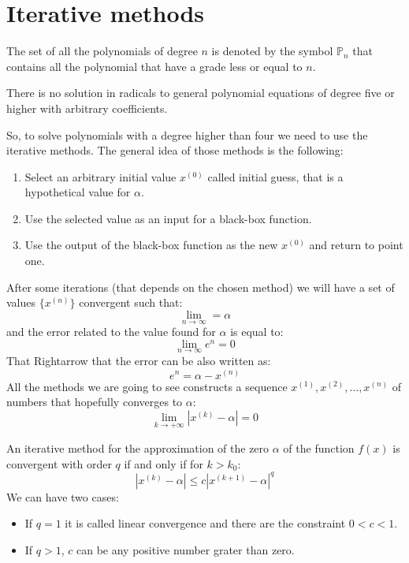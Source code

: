 \documentclass[12pt, a4paper]{report}
\begin{document}
    \section{Iterative methods}
    The set of all the polynomials of degree $n$ is denoted by the symbol $\mathbb{P}_n$ that contains all the polynomial that have a grade less or equal to $n$.
    \begin{theorem}
        There is no solution in radicals to general polynomial equations of degree five or higher with arbitrary coefficients. 
    \end{theorem}
    So, to solve polynomials with a degree higher than four we need to use the iterative methods. The general idea of those methods is the following:
    \begin{enumerate}
        \item Select an arbitrary initial value $x^{(0)}$ called initial guess, that is a hypothetical value for $\alpha$.
        \item Use the selected value as an input for a black-box function.
        \item Use the output of the black-box function as the new $x^{(0)}$ and return to point one. 
    \end{enumerate}
    After some iterations (that depends on the chosen method) we will have a set of values $\{ x^{(n)} \}$ convergent such that:
    \[ \lim_{n \rightarrow \infty} = \alpha\]
    and the error related to the value found for $\alpha$ is equal to: 
    \[ \lim_{n \rightarrow \infty}e^n = 0\]
    That Rightarrow that the error can be also written as: 
    \[e^n=\alpha-x^{(n)}\]
    All the methods we are going to see constructs a sequence $x^{(1)},x^{(2)},\dots,x^{(n)}$ of numbers that hopefully converges to $\alpha$:
    \[ \lim_{k \rightarrow + \infty} \left\lvert x^{(k)}-\alpha \right\rvert =0\]
    \begin{definition}
        An iterative method for the approximation of the zero $\alpha$ of the function $f(x)$ is convergent with order $q$ if and only if for $k > k_0$:
        \[\left\lvert x^{(k)} - \alpha \right\rvert \leq c {\left\lvert x^{(k+1)} - \alpha \right\rvert}^q  \]
        We can have two cases:
        \begin{itemize}
            \item If $q=1$ it is called linear convergence and there are the constraint $0<c<1$.
            \item If $q>1$, $c$ can be any positive number grater than zero. 
        \end{itemize}
    \end{definition}
\end{document}

